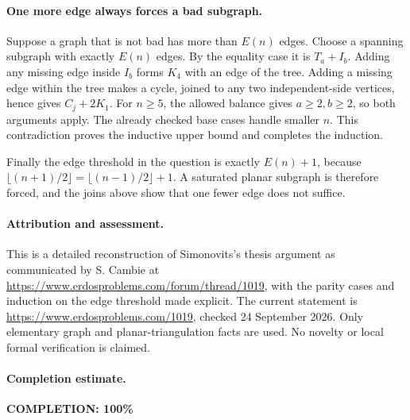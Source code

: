 \paragraph{One more edge always forces a bad subgraph.}
Suppose a graph that is not bad has more than \(E(n)\) edges. Choose a spanning subgraph with exactly \(E(n)\) edges. By the equality case it is \(T_a+I_b\). Adding any missing edge inside \(I_b\) forms \(K_4\) with an edge of the tree. Adding a missing edge within the tree makes a cycle, joined to any two independent-side vertices, hence gives \(C_j+2K_1\). For \(n\geq5\), the allowed balance gives \(a\geq2,b\geq2\), so both arguments apply. The already checked base cases handle smaller \(n\). This contradiction proves the inductive upper bound and completes the induction.

Finally the edge threshold in the question is exactly \(E(n)+1\), because
\(\lfloor(n+1)/2\rfloor=\lfloor(n-1)/2\rfloor+1\). A saturated planar subgraph is therefore forced, and the joins above show that one fewer edge does not suffice.

\paragraph{Attribution and assessment.}
This is a detailed reconstruction of Simonovits's thesis argument as communicated by S. Cambie at \url{https://www.erdosproblems.com/forum/thread/1019}, with the parity cases and induction on the edge threshold made explicit. The current statement is \url{https://www.erdosproblems.com/1019}, checked 24 September 2026. Only elementary graph and planar-triangulation facts are used. No novelty or local formal verification is claimed.

\paragraph{Completion estimate.}
\textbf{COMPLETION: 100\%}
